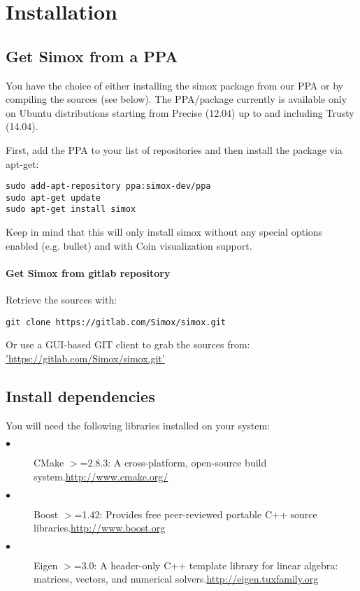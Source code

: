 \chapter{Installation}
\section{Get Simox from a PPA}
You have the choice of either installing the simox package from our PPA or by compiling the sources (see below). The PPA/package currently is available only on Ubuntu distributions starting from Precise (12.04) up to and including Trusty (14.04).
\par
First, add the PPA to your list of repositories and then install the package via apt-get: 
\begin{lstlisting}
sudo add-apt-repository ppa:simox-dev/ppa
sudo apt-get update
sudo apt-get install simox
\end{lstlisting}
Keep in mind that this will only install simox without any special options enabled (e.g. bullet) and with Coin visualization support. 
\subsubsection{Get Simox from gitlab repository}
Retrieve the sources with: 
\begin{lstlisting}
git clone https://gitlab.com/Simox/simox.git
\end{lstlisting}
Or use a GUI-based GIT client to grab the sources from: 
\hyperref[simox gitlab]{'https://gitlab.com/Simox/simox.git'}
\section{Install dependencies}
You will need the following libraries installed on your system: 

\begin{description}
\item[$\bullet$ ] CMake $>$=2.8.3: A cross-platform, open-source build system.\hyperref[cmake]{http://www.cmake.org/} 
\item[$\bullet$ ] Boost $>$=1.42: Provides free peer-reviewed portable C++ source libraries.\hyperref[boost]{http://www.boost.org} 
\item[$\bullet$ ] Eigen $>$=3.0: A header-only C++ template library for linear algebra: matrices, vectors, and numerical solvers.\hyperref[Eigen]{http://eigen.tuxfamily.org} 
\end{description}
